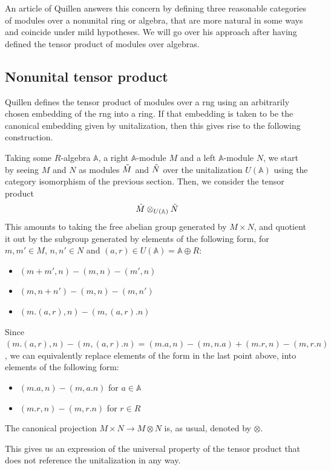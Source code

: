 \documentclass[a4paper,fleqn]{cas-sc}
\newcommand{\bA}{\mathbb{A}}
\begin{document}
An article of Quillen \cite{quillen} answers this concern by defining three reasonable categories of modules over a nonunital ring or algebra, that are more natural in some ways and coincide under mild hypotheses. We will go over his approach after having defined the tensor product of modules over algebras.

\subsection{Nonunital tensor product}
Quillen defines the tensor product of modules over a rng using an arbitrarily chosen embedding of the rng into a ring. If that embedding is taken to be the canonical embedding given by unitalization, then this gives rise to the following construction. 

Taking some $R$-algebra $\bA$, a right $\bA$-module $M$ and a left $\bA$-module $N$, we start by seeing $M$ and $N$ as modules $\Tilde{M}$ and $\Tilde{N}$ over the unitalization $U(\bA)$ using the category isomorphism of the previous section. Then, we consider the tensor product
\[
\Tilde{M} \otimes_{U(\bA)} \Tilde{N}   
\]
This amounts to taking the free abelian group generated by $M \times N$, and quotient it out by the subgroup generated by elements of the following form, for $m,m' \in M$, $n,n' \in N$ and $(a,r) \in U(\bA) = \bA \oplus R$:
\begin{itemize}
    \item $(m+m', n) - (m,n) - (m',n)$
    \item $(m, n+n') - (m,n) - (m,n')$
    \item $(m.(a,r), n) - (m, (a, r).n)$
\end{itemize}
Since $(m.(a,r), n) - (m, (a, r).n) = (m.a, n) - (m, n.a) + (m.r, n) - (m, r.n)$, we can equivalently replace elements of the form in the last point above, into elements of the following form:
\begin{itemize}
    \item $(m.a, n) - (m, a.n)$ for $a \in \bA$
    \item $(m.r, n) - (m, r.n)$ for $r \in R$
\end{itemize}

The canonical projection $M \times N \to M \otimes N$ is, as usual, denoted by $\otimes$.

This gives us an expression of the universal property of the tensor product that does not reference the unitalization in any way.
\end{document}
